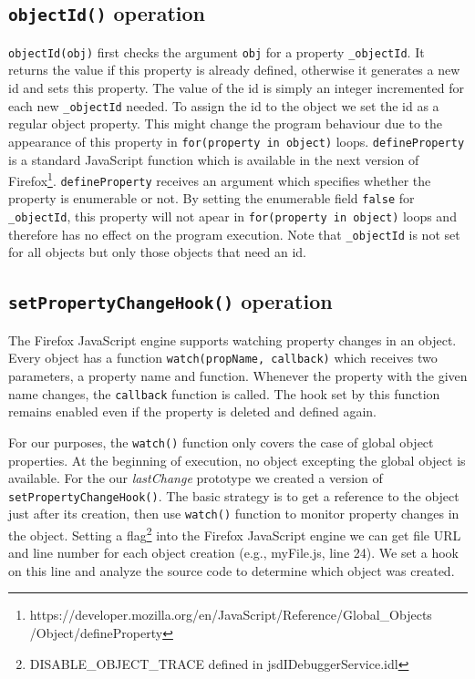 \documentclass[runningheads,a4paper]{llncs}
\begin{document}
\subsection{\texttt{objectId()} operation}
\texttt{objectId(obj)} first checks the argument \texttt{obj} for a property \texttt{\_objectId}.
It returns the value if this property is already defined,
otherwise it generates a new id and sets this property. The value of the id is simply an integer incremented 
for each new \texttt{\_objectId} needed. To assign the id to the object we 
set the id as a regular object property. This might change
the program behaviour due to the appearance of this property in 
\texttt{for(property in object)} loops. \texttt{defineProperty} is a standard JavaScript
function which is available in the next version of Firefox\footnote[1]{https://developer.mozilla.org/en/JavaScript/Reference/Global\_Objects\\/Object/defineProperty}. \texttt{defineProperty} receives 
an argument which specifies whether the property is enumerable or not. By setting the enumerable
field \texttt{false} for \texttt{\_objectId}, this property will not
apear in \texttt{for(property in object)} loops and therefore has no
effect on the program execution. Note that \texttt{\_objectId} is
not set for all objects but only those objects that need an id.

\subsection{\texttt{setPropertyChangeHook()} operation}
The Firefox JavaScript engine supports watching property changes in an
object. Every object has a function \texttt{watch(propName, callback)}
which receives two parameters, a property name and function.  Whenever
the property with the given name changes, the \texttt{callback} function is
called. The hook set by this function remains enabled even if the
property is deleted and defined again. 

For our purposes, the \texttt{watch()} function only covers the case
of global object properties. At the beginning of execution, no object
excepting the global object is available.  For 
the our \textit{lastChange} prototype we created a version of
\texttt{setPropertyChangeHook()}.  The basic strategy is to get a reference to the object just
after its creation, then use \texttt{watch()} function to monitor
property changes in the object. Setting a flag\footnote[2]{DISABLE\_OBJECT\_TRACE defined in jsdIDebuggerService.idl} into the Firefox %
JavaScript engine we can get file URL and line number for each object
creation (e.g., myFile.js, line 24). We set a hook on this line
and analyze the source code to determine which object was created.
\end{document}
